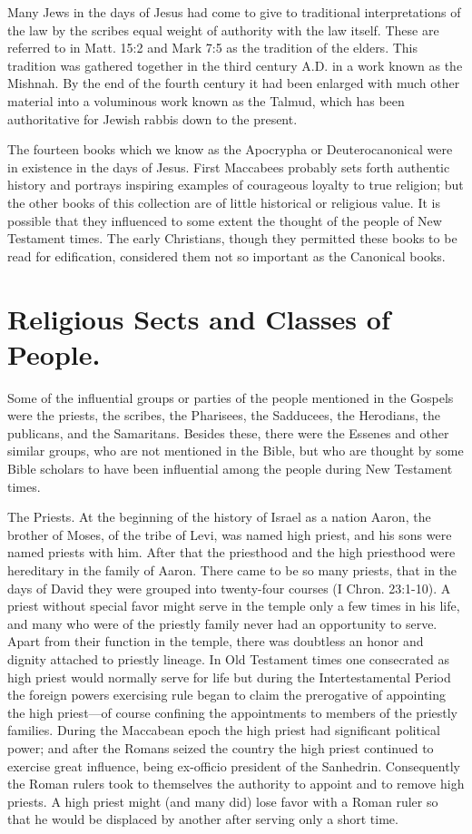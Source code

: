 Many Jews in the days of Jesus had come to give to traditional interpretations of the law by the scribes equal weight of authority with the law itself. These are referred to in Matt. 15:2 and Mark 7:5 as the tradition of the elders. This tradition was gathered together in the third century A.D. in a work known as the Mishnah. By the end of the fourth century it had been enlarged with much other material into a voluminous work known as the Talmud, which has been authoritative for Jewish rabbis down to the present.

The fourteen books which we know as the Apocrypha or Deuterocanonical were in existence in the days of Jesus. First Maccabees probably sets forth authentic history and portrays inspiring examples of courageous loyalty to true religion; but the other books of this collection are of little historical or religious value. It is possible that they influenced to some extent the thought of the people of New Testament times. The early Christians, though they permitted these books to be read for edification, considered them not so important as the Canonical books.

\section{Religious Sects and Classes of People.}

Some of the influential groups or parties of the people mentioned in the Gospels were the priests, the scribes, the Pharisees, the Sadducees, the Herodians, the publicans, and the Samaritans. Besides these, there were the Essenes and other similar groups, who are not mentioned in the Bible, but who are thought by some Bible scholars to have been influential among the people during New Testament times.

The Priests. At the beginning of the history of Israel as a nation Aaron, the brother of Moses, of the tribe of Levi, was named high priest, and his sons were named priests with him. After that the priesthood and the high priesthood were hereditary in the family of Aaron. There came to be so many priests, that in the days of David they were grouped into twenty-four courses (I Chron. 23:1-10). A priest without special favor might serve in the temple only a few times in his life, and many who were of the priestly family never had an opportunity to serve. Apart from their function in the temple, there was doubtless an honor and dignity attached to priestly lineage. In Old Testament times one consecrated as high priest would normally serve for life but during the Intertestamental Period the foreign powers exercising rule began to claim the prerogative of appointing the high priest---of course confining the appointments to members of the priestly families. During the Maccabean epoch the high priest had significant political power; and after the Romans seized the country the high priest continued to exercise great influence, being ex-officio president of the Sanhedrin. Consequently the Roman rulers took to themselves the authority to appoint and to remove high priests. A high priest might (and many did) lose favor with a Roman ruler so that he would be displaced by another after serving only a short time.

